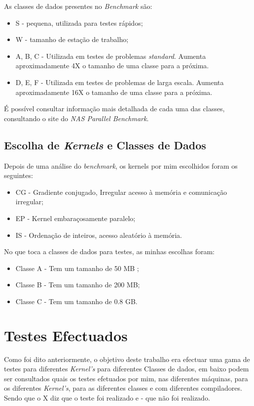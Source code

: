 \documentclass[conference,compsoc]{IEEEtran}
\begin{document}
As classes de dados\cite{nas_site} presentes no \textit{Benchmark} são:
\begin{itemize}
\item S - pequena, utilizada para testes rápidos;
\item W - tamanho de estação de trabalho;
\item A, B, C - Utilizada em testes de problemas \textit{standard}. Aumenta aproximadamente 4X o tamanho de uma classe para a próxima.
\item D, E, F - Utilizada em testes de problemas de larga escala. Aumenta aproximadamente 16X o tamanho de uma classe para a próxima.
\end{itemize}
É possível consultar informação mais detalhada de cada uma das classes, consultando o site do \textit{NAS Parallel Benchmark}\cite{classes}.

\subsection{Escolha de \textit{Kernels} e Classes de Dados}
Depois de uma análise do \textit{benchmark}, os kernels por mim escolhidos foram os seguintes:
\begin{itemize}
\item CG \cite{nas_site} - Gradiente conjugado, Irregular acesso à memória e comunicação irregular;
\item EP \cite{nas_site} - Kernel embaraçosamente paralelo; 
\item IS  \cite{nas_site} - Ordenação de inteiros, acesso aleatório à memória.
\end{itemize}
No que toca a classes de dados para testes, as minhas escolhas foram:
\begin{itemize}
\item Classe A \cite{classes} - Tem um tamanho de 50 MB ;
\item Classe B \cite{classes} - Tem um tamanho de 200 MB;
\item Classe C \cite{classes} - Tem um tamanho de 0.8 GB.
\end{itemize}

\section{Testes Efectuados}
Como foi dito anteriormente, o objetivo deste trabalho era efectuar uma gama de testes para diferentes \textit{Kernel's} para diferentes Classes de dados, em baixo podem ser consultados quais os testes efetuados por mim, nas diferentes máquinas, para os diferentes \textit{Kernel's}, para as diferentes classes e com diferentes compiladores. Sendo que o X diz que o teste foi realizado e - que não foi realizado.
\end{document}
